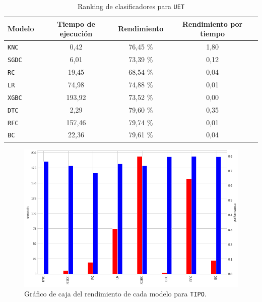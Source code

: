 \documentclass[a4paper,12pt]{article}
\begin{document}
\begin{table}[H]
\centering
\begin{tabular}{lccc}
\textbf{Modelo} & \textbf{Tiempo de ejecución} & \textbf{Rendimiento} & \textbf{Rendimiento por tiempo} \\ \hline
\texttt{KNC}  & 0,42   & 76,45 \% & 1,80 \\
\texttt{SGDC} & 6,01   & 73,39 \% & 0,12 \\
\texttt{RC}   & 19,45  & 68,54 \% & 0,04 \\
\texttt{LR}   & 74,98  & 74,88 \% & 0,01 \\
\texttt{XGBC} & 193,92 & 73,52 \% & 0,00 \\
\texttt{DTC}  & 2,29   & 79,60 \% & 0,35 \\
\texttt{RFC}  & 157,46 & 79,74 \% & 0,01 \\
\texttt{BC}   & 22,36  & 79,61 \% & 0,04
\end{tabular}
\caption{Ranking de clasificadores para \texttt{UET}}
\label{tab:ranking-uet-table}
\end{table}

\begin{figure}[H]
	\begin{center}
	\includegraphics[width=1\textwidth]{tesis_71.png}
  	\caption{Gráfico de caja del rendimiento de cada modelo para \texttt{TIPO}.}
  	\label{fig:timesmodeluet}
  	\end{center}
\end{figure}
\end{document}
